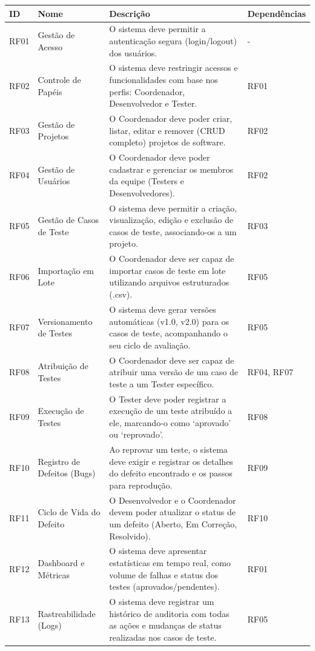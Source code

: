 \begin{quadro}[H]
\centering
\caption{Requisitos Funcionais (RF) do Test-Manager.}
\label{tab:req_funcionais}
\small
\begin{tabularx}{\textwidth}{|l|p{3.2cm}|X|l|}
\hline
\textbf{ID} & \textbf{Nome} & \textbf{Descrição} & \textbf{Dependências} \\ \hline
RF01 & Gestão de Acesso & O sistema deve permitir a autenticação segura (login/logout) dos usuários. & - \\ \hline
RF02 & Controle de Papéis & O sistema deve restringir acessos e funcionalidades com base nos perfis: Coordenador, Desenvolvedor e Tester. & RF01 \\ \hline
RF03 & Gestão de Projetos & O Coordenador deve poder criar, listar, editar e remover (CRUD completo) projetos de software. & RF02 \\ \hline
RF04 & Gestão de Usuários & O Coordenador deve poder cadastrar e gerenciar os membros da equipe (Testers e Desenvolvedores). & RF02 \\ \hline
RF05 & Gestão de Casos de Teste & O sistema deve permitir a criação, visualização, edição e exclusão de casos de teste, associando-os a um projeto. & RF03 \\ \hline
RF06 & Importação em Lote & O Coordenador deve ser capaz de importar casos de teste em lote utilizando arquivos estruturados (.csv). & RF05 \\ \hline
RF07 & Versionamento de Testes & O sistema deve gerar versões automáticas (v1.0, v2.0) para os casos de teste, acompanhando o seu ciclo de avaliação. & RF05 \\ \hline
RF08 & Atribuição de Testes & O Coordenador deve ser capaz de atribuir uma versão de um caso de teste a um Tester específico. & RF04, RF07 \\ \hline
RF09 & Execução de Testes & O Tester deve poder registrar a execução de um teste atribuído a ele, marcando-o como `aprovado' ou `reprovado'. & RF08 \\ \hline
RF10 & Registro de Defeitos (Bugs) & Ao reprovar um teste, o sistema deve exigir e registrar os detalhes do defeito encontrado e os passos para reprodução. & RF09 \\ \hline
RF11 & Ciclo de Vida do Defeito & O Desenvolvedor e o Coordenador devem poder atualizar o status de um defeito (Aberto, Em Correção, Resolvido). & RF10 \\ \hline
RF12 & Dashboard e Métricas & O sistema deve apresentar estatísticas em tempo real, como volume de falhas e status dos testes (aprovados/pendentes). & RF01 \\ \hline
RF13 & Rastreabilidade (Logs) & O sistema deve registrar um histórico de auditoria com todas as ações e mudanças de status realizadas nos casos de teste. & RF05 \\ \hline
\end{tabularx}
\end{quadro}

